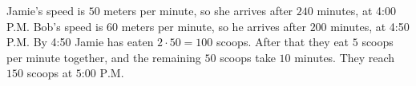 Jamie's speed is $50$ meters per minute, so she arrives after $240$ minutes, at 4:00 P.M. Bob's speed is $60$ meters per minute, so he arrives after $200$ minutes, at 4:50 P.M. By 4:50 Jamie has eaten $2\cdot50=100$ scoops. After that they eat $5$ scoops per minute together, and the remaining $50$ scoops take $10$ minutes. They reach $150$ scoops at $\boxed{\text{5:00 P.M.}}$
